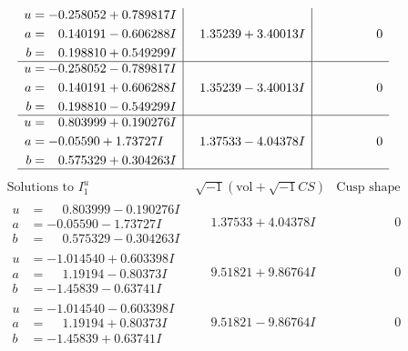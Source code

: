 \documentclass[1p]{elsarticle_modified}
\theoremstyle{definition}
\newcommand{\I}{\sqrt{-1}}
\begin{document}
$$\begin{array}{c|c|c}
\begin{aligned}
u &= -0.258052 + 0.789817 I \\
a &= \phantom{-}0.140191 - 0.606288 I \\
b &= \phantom{-}0.198810 + 0.549299 I\end{aligned}
 & \phantom{-}1.35239 + 3.40013 I & \phantom{-0.000000 } 0 \\ \hline\begin{aligned}
u &= -0.258052 - 0.789817 I \\
a &= \phantom{-}0.140191 + 0.606288 I \\
b &= \phantom{-}0.198810 - 0.549299 I\end{aligned}
 & \phantom{-}1.35239 - 3.40013 I & \phantom{-0.000000 } 0 \\ \hline\begin{aligned}
u &= \phantom{-}0.803999 + 0.190276 I \\
a &= -0.05590 + 1.73727 I \\
b &= \phantom{-}0.575329 + 0.304263 I\end{aligned}
 & \phantom{-}1.37533 - 4.04378 I & \phantom{-0.000000 } 0\\
 \hline 
 \end{array}$$\newpage$$\begin{array}{c|c|c}  
\text{Solutions to }I^u_{1}& \I (\text{vol} + \sqrt{-1}CS) & \text{Cusp shape}\\
 \hline 
\begin{aligned}
u &= \phantom{-}0.803999 - 0.190276 I \\
a &= -0.05590 - 1.73727 I \\
b &= \phantom{-}0.575329 - 0.304263 I\end{aligned}
 & \phantom{-}1.37533 + 4.04378 I & \phantom{-0.000000 } 0 \\ \hline\begin{aligned}
u &= -1.014540 + 0.603398 I \\
a &= \phantom{-}1.19194 - 0.80373 I \\
b &= -1.45839 - 0.63741 I\end{aligned}
 & \phantom{-}9.51821 + 9.86764 I & \phantom{-0.000000 } 0 \\ \hline\begin{aligned}
u &= -1.014540 - 0.603398 I \\
a &= \phantom{-}1.19194 + 0.80373 I \\
b &= -1.45839 + 0.63741 I\end{aligned}
 & \phantom{-}9.51821 - 9.86764 I & \phantom{-0.000000 } 0 \\ \hline\begin{aligned}

\end{aligned}
\end{array}$$
\end{document}

